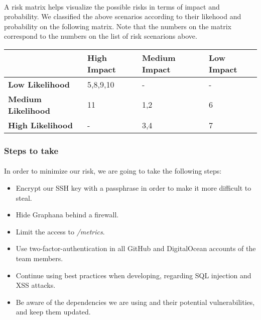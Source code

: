 \paragraph{} A risk matrix helps visualize the possible risks in terms of impact and probability. We classified the above scenarios according to their likehood and probability on the following matrix. Note that the numbers on the matrix correspond to the numbers on the list of risk scenarions above. \\
\begin{tabular}{|l|l|l|l|}
	\hline
	                           & \textbf{High Impact} & \textbf{Medium Impact} & \textbf{Low Impact} \\ \hline
	\textbf{Low Likelihood}    & 5,8,9,10             & -                      & -                   \\ \hline
	\textbf{Medium Likelihood} & 11                   & 1,2                    & 6                   \\ \hline
	\textbf{High Likelihood}   & -                    & 3,4                    & 7                   \\ \hline
\end{tabular}

\subsubsection{Steps to take}
\paragraph{} In order to minimize our risk, we are going to take the following steps:
\begin{itemize}
	\item Encrypt our SSH key with a passphrase in order to make it more difficult to steal.
	\item Hide Graphana behind a firewall.
	\item Limit the access to \textit{/metrics}.
	\item Use two-factor-authentication in all GitHub and DigitalOcean accounts of the team members.
	\item Continue using best practices when developing, regarding SQL injection and XSS attacks.
	\item Be aware of the dependencies we are using and their potential vulnerabilities, and keep them updated.
\end{itemize}

